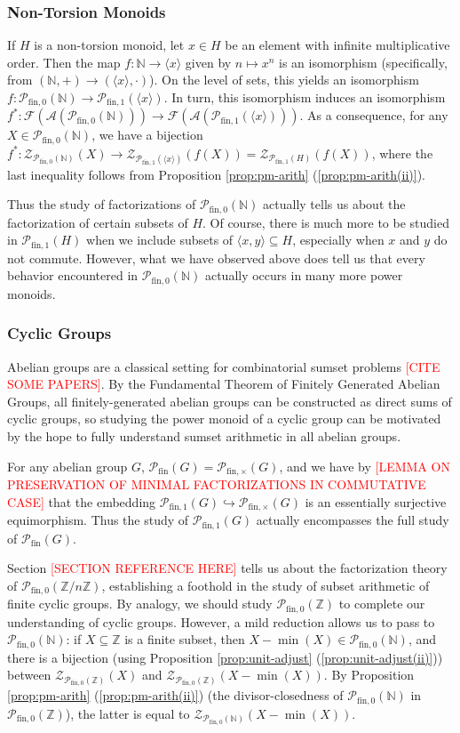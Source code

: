 \documentclass{report}
\newcommand{\A}{\mathscr{A}}
\newcommand{\F}{\mathscr{F}}
\newcommand{\NN}{\mathbb{N}}
\renewcommand{\P}{\mathcal{P}}
\newcommand{\ZZ}{\mathbb{Z}}
\newcommand{\Z}{\mathcal{Z}}
\newcommand{\gen}[1]{\langle #1 \rangle}
\newcommand{\fin}{\textrm{fin}}
\newcommand{\funt}{{\textrm{fin}, \times}}
\newcommand{\fun}{{\textrm{fin}, 1}}
\newcommand{\fon}{{\textrm{fin}, 0}}
\renewcommand{\:}{\text{:}}
\newcommand{\PN}{{\P_{\fin,0}(\NN)}}
\theoremstyle{definition}
\begin{document}
\subsubsection*{Non-Torsion Monoids}

If $H$ is a non-torsion monoid, let $x\in H$ be an element with infinite multiplicative order.  
Then the map $f: \NN \to \gen{x}$ given by $n\mapsto x^n$ is an isomorphism (specifically, from $(\NN,+)\to (\gen{x},\cdot)$).
On the level of sets, this yields an isomorphism $f: \PN \to \P_\fun(\gen{x})$.
In turn, this isomorphism induces an isomorphism $f^*: \F(\A(\PN)) \to \F(\A(\P_\fun(\gen{x})))$.
As a consequence, for any $X \in \PN$, we have a bijection $f^*: \Z_{\PN}(X) \to \Z_{\P_\fun(\gen{x})}(f(X)) = \Z_{\P_\fun(H)}(f(X))$, where the last inequality follows from Proposition \ref{prop:pm-arith} (\ref{prop:pm-arith(ii)}).

Thus the study of factorizations of $\PN$ actually tells us about the factorization of certain subsets of $H$.
Of course, there is much more to be studied in $\P_\fun(H)$ when we include subsets of $\gen{x,y}\subseteq H$, especially when $x$ and $y$ do not commute.
However, what we have observed above does tell us that every behavior encountered in $\PN$ actually occurs in many more power monoids.


\subsubsection*{Cyclic Groups}

Abelian groups are a classical setting for combinatorial sumset problems \textcolor{red}{[CITE SOME PAPERS]}.
By the Fundamental Theorem of Finitely Generated Abelian Groups, all finitely-generated abelian groups can be constructed as direct sums of cyclic groups, so studying the power monoid of a cyclic group can be motivated by the hope to fully understand sumset arithmetic in all abelian groups.

For any abelian group $G$, $\P_\fin(G)  = \P_\funt(G)$, and we have by \textcolor{red}{[LEMMA ON PRESERVATION OF MINIMAL FACTORIZATIONS IN COMMUTATIVE CASE]} that the embedding $\P_\fun(G) \hookrightarrow \P_\funt(G)$ is an essentially surjective equimorphism.
Thus the study of $\P_\fun(G)$ actually encompasses the full study of $\P_\fin(G)$. 

Section \textcolor{red}{[SECTION REFERENCE HERE]} tells us about the factorization theory of $\P_\fon(\ZZ/n\ZZ)$, establishing a foothold in the study of subset arithmetic of finite cyclic groups.  
By analogy, we should study $\P_\fon(\ZZ)$ to complete our understanding of cyclic groups.
However, a mild reduction allows us to pass to $\PN$: if $X \subseteq \ZZ$ is a finite subset, then $X-\min(X) \in \PN$, and there is a bijection (using Proposition \ref{prop:unit-adjust} (\ref{prop:unit-adjust(ii)})) between $\Z_{\P_\fon(\ZZ)}(X)$ and $\Z_{\P_\fon(\ZZ)}(X-\min(X))$.
By Proposition \ref{prop:pm-arith} (\ref{prop:pm-arith(ii)}) (the divisor-closedness of $\PN$ in $\P_\fon(\ZZ)$), the latter is equal to $\Z_{\PN}(X-\min(X))$.
\end{document}

